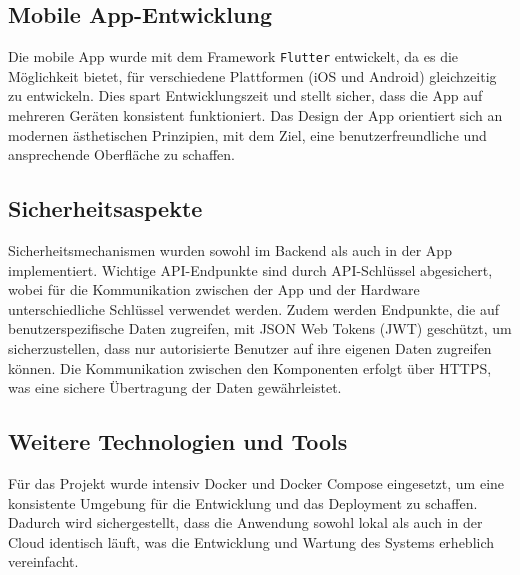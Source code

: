 \subsection{Mobile App-Entwicklung}
Die mobile App wurde mit dem Framework \texttt{Flutter} entwickelt, da es die Möglichkeit bietet, 
für verschiedene Plattformen (iOS und Android) gleichzeitig zu entwickeln. Dies spart 
Entwicklungszeit und stellt sicher, dass die App auf mehreren Geräten konsistent funktioniert. 
Das Design der App orientiert sich an modernen ästhetischen Prinzipien, mit dem Ziel, eine 
benutzerfreundliche und ansprechende Oberfläche zu schaffen.

\subsection{Sicherheitsaspekte}
Sicherheitsmechanismen wurden sowohl im Backend als auch in der App implementiert. Wichtige 
API-Endpunkte sind durch API-Schlüssel abgesichert, wobei für die Kommunikation zwischen der App 
und der Hardware unterschiedliche Schlüssel verwendet werden. Zudem werden Endpunkte, die auf 
benutzerspezifische Daten zugreifen, mit JSON Web Tokens (JWT) geschützt, um sicherzustellen, 
dass nur autorisierte Benutzer auf ihre eigenen Daten zugreifen können. Die Kommunikation zwischen 
den Komponenten erfolgt über HTTPS, was eine sichere Übertragung der Daten gewährleistet.

\subsection{Weitere Technologien und Tools}
Für das Projekt wurde intensiv Docker und Docker Compose eingesetzt, um eine konsistente Umgebung 
für die Entwicklung und das Deployment zu schaffen. Dadurch wird sichergestellt, dass die Anwendung 
sowohl lokal als auch in der Cloud identisch läuft, was die Entwicklung und Wartung des Systems 
erheblich vereinfacht.


